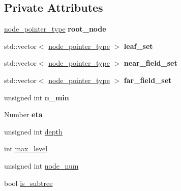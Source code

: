 \subsection*{Private Attributes}
\begin{DoxyCompactItemize}
\item 
\mbox{\label{classBlockClusterTree_ac1111e02e99c25545857e6ce85c73fa0}} 
\hyperlink{classTreeNode}{node\+\_\+pointer\+\_\+type} {\bfseries root\+\_\+node}
\item 
\mbox{\label{classBlockClusterTree_a4a070c8bebf3afb8eac8348be3cae226}} 
std\+::vector$<$ \hyperlink{classTreeNode}{node\+\_\+pointer\+\_\+type} $>$ {\bfseries leaf\+\_\+set}
\item 
\mbox{\label{classBlockClusterTree_a91ff2520dacea664e08437b3bc54034a}} 
std\+::vector$<$ \hyperlink{classTreeNode}{node\+\_\+pointer\+\_\+type} $>$ {\bfseries near\+\_\+field\+\_\+set}
\item 
\mbox{\label{classBlockClusterTree_afb80508e2eceac6545cdbac7310fcaa3}} 
std\+::vector$<$ \hyperlink{classTreeNode}{node\+\_\+pointer\+\_\+type} $>$ {\bfseries far\+\_\+field\+\_\+set}
\item 
\mbox{\label{classBlockClusterTree_ab47a6ccabcf386897ea3fa4341827c25}} 
unsigned int {\bfseries n\+\_\+min}
\item 
\mbox{\label{classBlockClusterTree_affa858180dc35e877eb64ab2afd1baef}} 
Number {\bfseries eta}
\item 
unsigned int \hyperlink{classBlockClusterTree_a77349ec9ccb36d45af3f176a93516897}{depth}
\item 
int \hyperlink{classBlockClusterTree_a9151f138713d01c53ac17f004c7e6b62}{max\+\_\+level}
\item 
unsigned int \hyperlink{classBlockClusterTree_a75757146cea0aa0e9271b760b1d76307}{node\+\_\+num}
\item 
bool \hyperlink{classBlockClusterTree_a8dc01af98989bb71246fa2cd4d7307da}{is\+\_\+subtree}
\end{DoxyCompactItemize}

